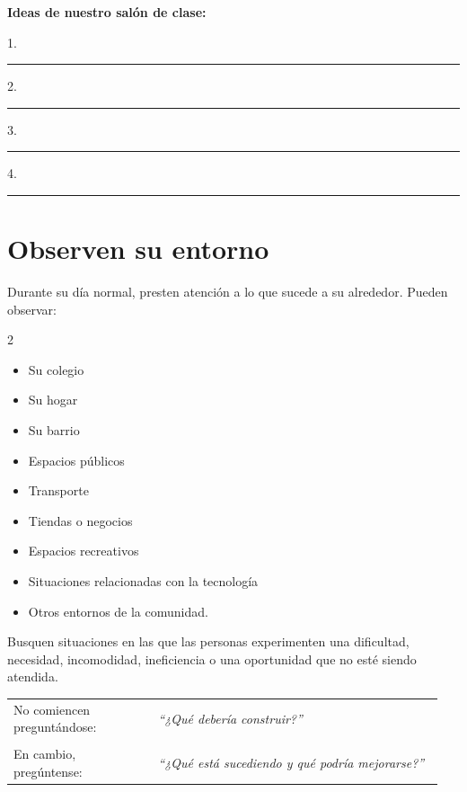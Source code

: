 \documentclass[12pt,a4paper]{article}
\begin{document}
	\vspace{0.3cm}
	
	\textbf{Ideas de nuestro salón de clase:}
	
	\vspace{0.1cm}
	
	1.\ \rule{0.85\linewidth}{0.4pt}
	
	\vspace{0.25cm}
	
	2.\ \rule{0.85\linewidth}{0.4pt}
	
	\vspace{0.25cm}
	
	3.\ \rule{0.85\linewidth}{0.4pt}
	
	\vspace{0.25cm}
	
	4.\ \rule{0.85\linewidth}{0.4pt}
	
	\vspace{-5mm}
	\section*{Observen su entorno}
	
	Durante su día normal, presten atención a lo que sucede a su alrededor. Pueden observar:
	
	\begin{multicols}{2}
		\begin{itemize}[leftmargin=0.6cm,itemsep=0pt]
			\item Su colegio
			\item Su hogar
			\item Su barrio
			\item Espacios públicos
			\item Transporte
			\item Tiendas o negocios
			\item Espacios recreativos
			\item Situaciones relacionadas con la tecnología
			\item Otros entornos de la comunidad.
		\end{itemize}
	\end{multicols}
	
	Busquen situaciones en las que las personas experimenten una dificultad, necesidad, incomodidad, ineficiencia o una oportunidad que no esté siendo atendida. \vspace{6mm}
	
	\begin{tabular}{@{}p{0.32\linewidth}p{0.63\linewidth}@{}}
		No comiencen preguntándose:
		&
		\textit{``¿Qué debería construir?''}
		\\[0.15cm]
		&\\
		En cambio, pregúntense:
		&
		\textit{``¿Qué está sucediendo y qué podría mejorarse?''}
	\end{tabular}
	
\end{document}
